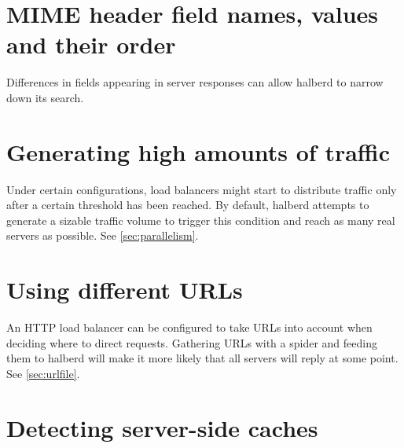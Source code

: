 \documentclass[a4paper]{book}
\begin{document}
\section{MIME header field names, values and their order}

Differences in fields appearing in server responses can allow halberd to
narrow down its search.

%

\section{Generating high amounts of traffic}

Under certain configurations, load balancers might start to distribute traffic
only after a certain threshold has been reached.  By default, halberd attempts
to generate a sizable traffic volume to trigger this condition and reach as
many real servers as possible. See \ref{sec:parallelism}.


\section{Using different URLs}

An HTTP load balancer can be configured to take URLs into account when deciding
where to direct requests. Gathering URLs with a spider and feeding them to
halberd will make it more likely that all servers will reply at some point.
See \ref{sec:urlfile}.

\section{Detecting server-side caches}
\end{document}

